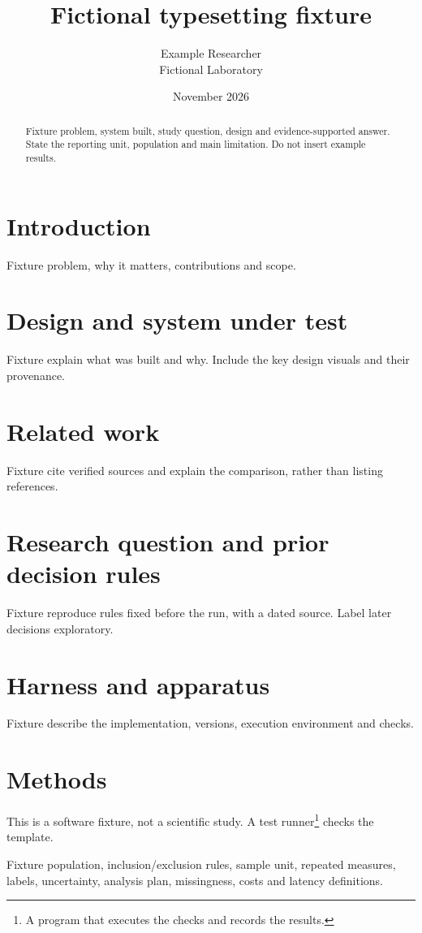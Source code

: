 \documentclass[11pt]{article}
\title{Fictional typesetting fixture}
\author{Example Researcher\\[3pt]\normalsize Fictional Laboratory}
\date{November 2026}
\begin{document}
\maketitle

\begin{abstract}
Fixture problem, system built, study question, design and evidence-supported answer.
State the reporting unit, population and main limitation. Do not insert example results.
\end{abstract}

\section{Introduction}
Fixture problem, why it matters, contributions and scope.

\section{Design and system under test}
Fixture explain what was built and why. Include the key design visuals and their provenance.

\section{Related work}
Fixture cite verified sources and explain the comparison, rather than listing references.

\section{Research question and prior decision rules}
Fixture reproduce rules fixed before the run, with a dated source. Label later decisions exploratory.

\section{Harness and apparatus}
Fixture describe the implementation, versions, execution environment and checks.

\section{Methods}
This is a software fixture, not a scientific study. A test runner\footnote{A program that executes the checks and records the results.} checks the template.\cite{fixture}

Fixture population, inclusion/exclusion rules, sample unit, repeated measures, labels,
uncertainty, analysis plan, missingness, costs and latency definitions.
\end{document}
